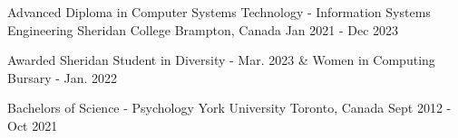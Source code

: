 \begin{cventries}
  \cventry
    {Advanced Diploma in Computer Systems Technology - Information Systems Engineering}
    {Sheridan College}
    {Brampton, Canada}
    {Jan 2021 - Dec 2023}
    {
      \begin{cvitems}
        \item{Awarded Sheridan Student in Diversity - Mar. 2023 \& Women in Computing Bursary - Jan. 2022}
      \end{cvitems}
    }
   \cventry
    {Bachelors of Science - Psychology}
    {York University}
    {Toronto, Canada}
    {Sept 2012 - Oct 2021}
    { }
\end{cventries}
